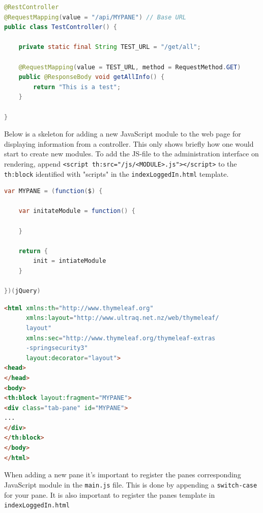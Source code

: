 \begin{lstlisting}[language=Java, captionpos=b, caption=Skeleton for a REST-controller, frame=bt, showstringspaces=false]
@RestController
@RequestMapping(value = "/api/MYPANE") // Base URL
public class TestController() {
    
    private static final String TEST_URL = "/get/all";
    
    @RequestMapping(value = TEST_URL, method = RequestMethod.GET)
    public @ResponseBody void getAllInfo() {
        return "This is a test";
    }
    
}
\end{lstlisting}

Below is a skeleton for adding a new JavaScript module to the web page for displaying information from a controller. This only shows briefly how one would start to create new modules. To add the JS-file to the administration interface on rendering, append \verb!<script th:src="/js/<MODULE>.js"></script>! to the \verb!th:block! identified with "scripts" in the \verb!indexLoggedIn.html! template. \\ 

\begin{lstlisting}[language=Java, captionpos=b, caption=Skeleton for a JavaScript module, frame=bt, showstringspaces=false]
var MYPANE = (function($) { 

    var initateModule = function() {
    
    }

    return {
        init = intiateModule
    }

})(jQuery)
\end{lstlisting}

\begin{lstlisting}[language=HTML, captionpos=b, caption=Skeleton for a Thymeleaf-template, frame=bt, showstringspaces=false]
<html xmlns:th="http://www.thymeleaf.org"
      xmlns:layout="http://www.ultraq.net.nz/web/thymeleaf/
      layout"
      xmlns:sec="http://www.thymeleaf.org/thymeleaf-extras
      -springsecurity3"
      layout:decorator="layout">
<head>
</head>
<body>
<th:block layout:fragment="MYPANE">
<div class="tab-pane" id="MYPANE">
...
</div>
</th:block>
</body>
</html>
\end{lstlisting}

When adding a new pane it's important to register the panes corresponding JavaScript module in the \verb!main.js! file. This is done by appending a \verb!switch-case! for your pane. It is also important to register the panes template in \verb!indexLoggedIn.html!

